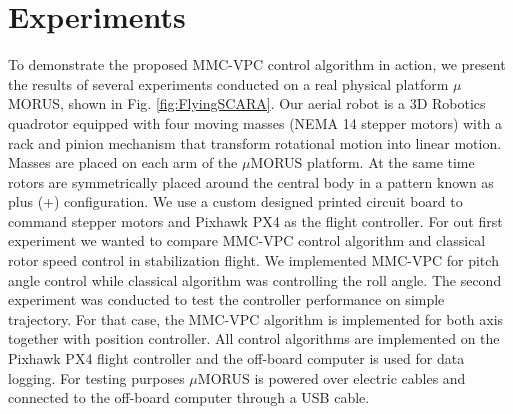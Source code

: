 \section{Experiments}
To demonstrate the proposed MMC-VPC control algorithm in action, we present the results of several experiments conducted on a real physical platform $\mu$MORUS, shown in Fig. \ref{fig:FlyingSCARA}. Our aerial robot is a 3D Robotics quadrotor equipped with four moving masses (NEMA 14 stepper motors) with a rack and pinion mechanism that transform rotational motion into linear motion. Masses are placed on each arm of the $\mu$MORUS platform. At the same time rotors are symmetrically placed around the central body in a pattern known as plus (+) configuration. We use a custom designed printed circuit board to command stepper motors and Pixhawk PX4 as the flight controller. For out first experiment we wanted to compare MMC-VPC control algorithm and classical rotor speed control in stabilization flight. We implemented MMC-VPC for pitch angle control while classical algorithm was controlling the roll angle. The second experiment was conducted to test the controller performance on simple trajectory. For that case, the MMC-VPC algorithm is implemented for both axis together with position controller. All control algorithms are implemented on the Pixhawk PX4 flight controller and the off-board computer is used for data logging. For testing purposes $\mu$MORUS is powered over electric cables and connected to the off-board computer through a USB cable.




